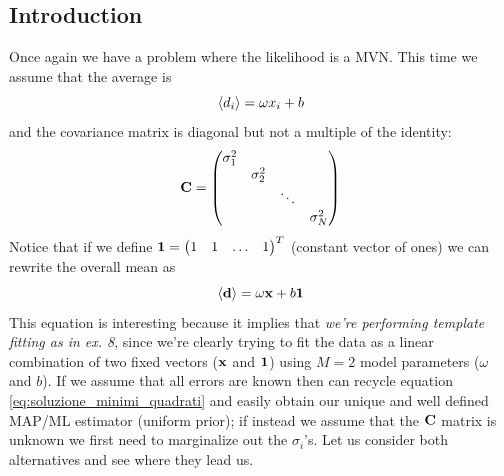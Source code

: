 \documentclass[a4paper]{article}
\newcommand{\mat}[1]{\vb{#1}}
\begin{document}
\subsection{Introduction}
Once again we have a problem where the likelihood is a MVN. This time we assume that the average is
\begin{equation*}
    \expval{d_i} = \omega x_i + b
\end{equation*}
and the covariance matrix is diagonal but not a multiple of the identity:
\begin{equation*}
    \mat{C} = \mqty(\dmat{\sigma_1^2, \sigma_2^2, \ddots, \sigma_N^2})
\end{equation*}
Notice that if we define $\vb{1} = \mqty(1 & 1 & \dots & 1)^T$ (constant vector of ones) we can rewrite the overall mean as
\begin{equation*}
    \expval{\vb{d}} = \omega \vb{x} + b\vb{1}
\end{equation*}
This equation is interesting because it implies that \emph{we're performing template fitting as in ex. 8}, since we're clearly trying to fit the data as a linear combination of two fixed vectors ($\vb{x}$ and $\vb{1}$) using $M=2$ model parameters ($\omega$ and $b$). If we assume that all errors are known then can recycle equation \eqref{eq:soluzione_minimi_quadrati} and easily obtain our unique and well defined MAP/ML estimator (uniform prior); if instead we assume that the $\mat{C}$ matrix is unknown we first need to marginalize out the $\sigma_i$'s. Let us consider both alternatives and see where they lead us.
\end{document}
